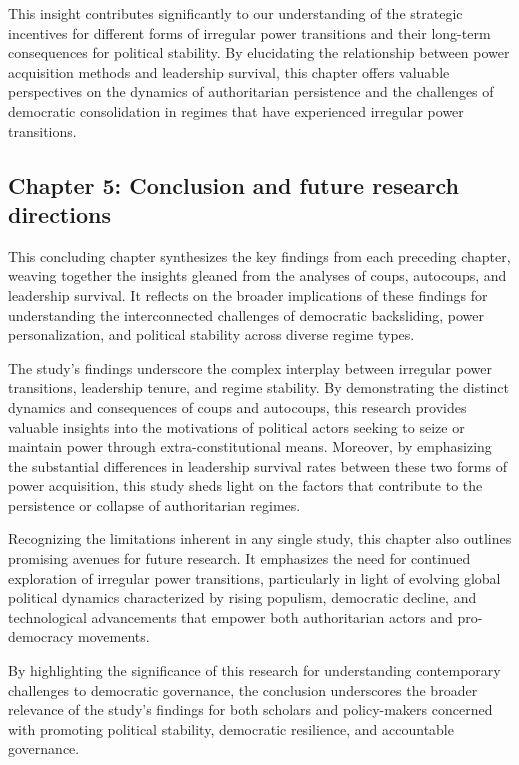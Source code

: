 \documentclass[
  12pt,
]{report}
\begin{document}
This insight contributes significantly to our understanding of the
strategic incentives for different forms of irregular power transitions
and their long-term consequences for political stability. By elucidating
the relationship between power acquisition methods and leadership
survival, this chapter offers valuable perspectives on the dynamics of
authoritarian persistence and the challenges of democratic consolidation
in regimes that have experienced irregular power transitions.

\subsection*{Chapter 5: Conclusion and future research
directions}\label{chapter-5-conclusion-and-future-research-directions}

This concluding chapter synthesizes the key findings from each preceding
chapter, weaving together the insights gleaned from the analyses of
coups, autocoups, and leadership survival. It reflects on the broader
implications of these findings for understanding the interconnected
challenges of democratic backsliding, power personalization, and
political stability across diverse regime types.

The study's findings underscore the complex interplay between irregular
power transitions, leadership tenure, and regime stability. By
demonstrating the distinct dynamics and consequences of coups and
autocoups, this research provides valuable insights into the motivations
of political actors seeking to seize or maintain power through
extra-constitutional means. Moreover, by emphasizing the substantial
differences in leadership survival rates between these two forms of
power acquisition, this study sheds light on the factors that contribute
to the persistence or collapse of authoritarian regimes.

Recognizing the limitations inherent in any single study, this chapter
also outlines promising avenues for future research. It emphasizes the
need for continued exploration of irregular power transitions,
particularly in light of evolving global political dynamics
characterized by rising populism, democratic decline, and technological
advancements that empower both authoritarian actors and pro-democracy
movements.

By highlighting the significance of this research for understanding
contemporary challenges to democratic governance, the conclusion
underscores the broader relevance of the study's findings for both
scholars and policy-makers concerned with promoting political stability,
democratic resilience, and accountable governance.
\end{document}
